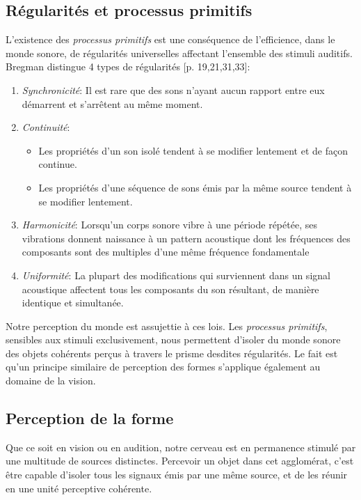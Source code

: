 \subsection{Régularités et processus primitifs}

L'existence des \emph{processus primitifs} est une conséquence de l'efficience, dans le monde sonore, de régularités universelles affectant l'ensemble des stimuli auditifs. Bregman distingue 4 types de régularités [p. 19,21,31,33]\citep{mcadams1994penser}:

\begin{enumerate}
\item \emph{Synchronicité}: Il est rare que des sons n'ayant aucun rapport entre eux démarrent et s'arrêtent au même moment.
\item \emph{Continuité}: 
\begin{itemize}
\item Les propriétés d'un son isolé tendent à se modifier lentement et de façon continue.
\item Les propriétés d'une séquence de sons émis par la même source tendent à se modifier lentement.
\end{itemize}
\item \emph{Harmonicité}: Lorsqu'un corps sonore vibre à une période répétée, ses vibrations donnent naissance à un pattern acoustique dont les fréquences des composants sont des multiples d'une même fréquence fondamentale
\item \emph{Uniformité}: La plupart des modifications qui surviennent dans un signal acoustique affectent tous les composants du son résultant, de manière identique et simultanée.
\end{enumerate}

Notre perception du monde est assujettie à ces lois. 
Les \emph{processus primitifs}, sensibles aux stimuli exclusivement, nous permettent d'isoler du monde sonore des objets cohérents perçus à travers le prisme desdites régularités\citep{ballas1987interpreting}. Le fait est qu'un principe similaire de perception des formes s'applique également au domaine de la vision.

\subsection{Perception de la forme}

Que ce soit en vision ou en audition, notre cerveau est en permanence stimulé par une multitude de sources distinctes. Percevoir un objet dans cet agglomérat, c'est être capable d'isoler tous les signaux émis par une même source, et de les réunir en une unité perceptive cohérente.

